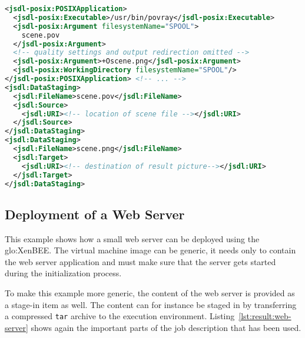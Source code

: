 \medskip
\begin{center}
  \begin{minipage}{.9\textwidth}
    \begin{lstlisting}[captionpos=b,backgroundcolor=\color{listingcolor},frame=lines,numbers=none,stepnumber=5,numberfirstline=false,numberstyle=\tiny,caption={Important
        parts from the JSDL to describe a \texttt{povray} execution (Note:
        the       listing   does not describe        a       valid       JSDL
        document).},label={lst:result:povray-cornell},language=XML]
<jsdl-posix:POSIXApplication>
  <jsdl-posix:Executable>/usr/bin/povray</jsdl-posix:Executable>
  <jsdl-posix:Argument filesystemName="SPOOL">
    scene.pov
  </jsdl-posix:Argument>
  <!-- quality settings and output redirection omitted -->
  <jsdl-posix:Argument>+Oscene.png</jsdl-posix:Argument>
  <jsdl-posix:WorkingDirectory filesystemName="SPOOL"/>
</jsdl-posix:POSIXApplication> <!-- ... -->
<jsdl:DataStaging>
  <jsdl:FileName>scene.pov</jsdl:FileName>
  <jsdl:Source>
    <jsdl:URI><!-- location of scene file --></jsdl:URI>
  </jsdl:Source>
</jsdl:DataStaging>
<jsdl:DataStaging>
  <jsdl:FileName>scene.png</jsdl:FileName>
  <jsdl:Target>
    <jsdl:URI><!-- destination of result picture--></jsdl:URI>
  </jsdl:Target>
</jsdl:DataStaging>
    \end{lstlisting}
  \end{minipage}
\end{center}

\subsection{Deployment of a Web Server}
\label{sec:deployment-of-a-web-server}

This  example shows  how a  small  web server  can be  deployed using  the
\gls{glo:XenBEE}. The virtual  machine image can be generic,  \ie it needs
only to  contain the web  server application and  must make sure  that the
server gets started during the initialization process.

To  make this  example more  generic,  the content  of the  web server  is
provided as  a stage-in  item as  well.  The content  can for  instance be
staged  in  by  transferring  a  compressed \texttt{tar}  archive  to  the
execution environment. Listing~\ref{lst:result:web-server} shows again the
important  parts  of  the  job   description  that  has  been  used.

